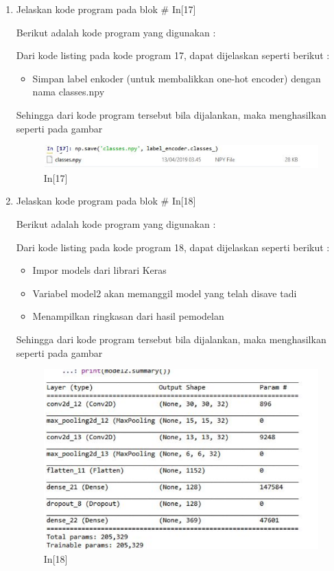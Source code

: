 \begin{enumerate}
\item Jelaskan kode program pada blok \# In[17]
\par Berikut adalah kode program yang digunakan :

\par Dari kode listing pada kode program 17, dapat dijelaskan seperti berikut :
\begin{itemize}
\item Simpan label enkoder (untuk membalikkan one-hot encoder) dengan nama classes.npy
\end{itemize}
\par Sehingga dari kode program tersebut bila dijalankan, maka menghasilkan seperti pada gambar 
\begin{figure}[!htbp]
	\centerline{\includegraphics[width=1\textwidth]{figures/andi/p17.PNG}}
	\caption{In[17]}
\end{figure}

\item Jelaskan kode program pada blok \# In[18]
\par Berikut adalah kode program yang digunakan :

\par Dari kode listing pada kode program 18, dapat dijelaskan seperti berikut :
\begin{itemize}
\item Impor models dari librari Keras
\item Variabel model2 akan memanggil model yang telah disave tadi 
\item Menampilkan ringkasan dari hasil pemodelan
\end{itemize}
\par Sehingga dari kode program tersebut bila dijalankan, maka menghasilkan seperti pada gambar 
\begin{figure}[!htbp]
	\centerline{\includegraphics[width=1\textwidth]{figures/andi/p18.PNG}}
	\caption{In[18]}
\end{figure}


\end{enumerate}
